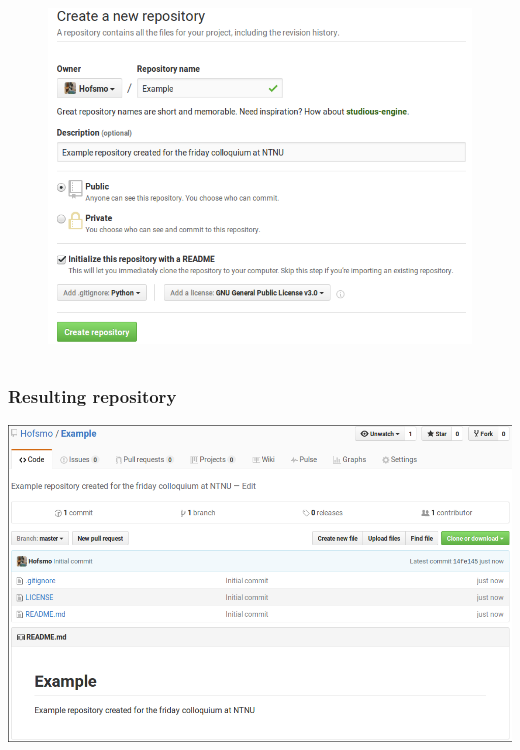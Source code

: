 \begin{frame}
\begin{columns}
\begin{column}{0.6\textwidth}
\begin{figure}
\begin{overprint}
					\includegraphics[width=\textwidth]{./pictures/rep_license.png}
				\end{overprint}
			\end{figure}
		\end{column}
	\end{columns}
\end{frame}
\begin{frame}
	\frametitle{Resulting repository}
	\includegraphics[width=\textwidth]{./pictures/repository.png}
\end{frame}
